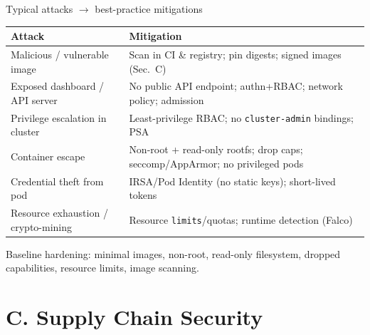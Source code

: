 \documentclass[aspectratio=169,10pt]{beamer}
\newcommand{\cmark}{\textcolor{good}{\ding{51}}}
\newcommand{\xmark}{\textcolor{bad}{\ding{55}}}
\begin{document}
\begin{frame}{Typical attacks $\rightarrow$ best-practice mitigations}
  \centering\small
  \renewcommand{\arraystretch}{1.3}
  \begin{tabular}{>{\raggedright\arraybackslash}p{5.6cm} >{\raggedright\arraybackslash}p{6.2cm}}
    \toprule
    \textbf{Attack \xmark} & \textbf{Mitigation \cmark}\\
    \midrule
    Malicious / vulnerable image & Scan in CI \& registry; pin digests; signed images (Sec.~C)\\
    Exposed dashboard / API server & No public API endpoint; authn+RBAC; network policy; admission\\
    Privilege escalation in cluster & Least-privilege RBAC; no \texttt{cluster-admin} bindings; PSA\\
    Container escape & Non-root + read-only rootfs; drop caps; seccomp/AppArmor; no privileged pods\\
    Credential theft from pod & IRSA/Pod Identity (no static keys); short-lived tokens\\
    Resource exhaustion / crypto-mining & Resource \texttt{limits}/quotas; runtime detection (Falco)\\
    \bottomrule
  \end{tabular}
  \vfill
  {\footnotesize\color{midgray}Baseline hardening: minimal images, non-root, read-only filesystem,
  dropped capabilities, resource limits, image scanning.}
\end{frame}

\section{C. Supply Chain Security}
\end{document}
